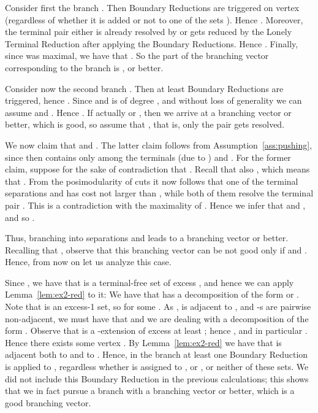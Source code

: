 Consider first the branch . Then  Boundary Reductions are triggered on vertex  (regardless of whether it is added or not to one of the sets ). Hence . Moreover, the terminal pair  either is already resolved by  or gets reduced by the Lonely Terminal Reduction after applying the Boundary Reductions. Hence . Finally, since  was maximal, we have that . So the part of the branching vector corresponding to the branch  is , or better.

Consider now the second branch . Then at least  Boundary Reductions are triggered, hence . Since  and  is of degree ,  and without loss of generality we can assume  and . Hence . If actually  or , then we arrive at a branching vector  or better, which is good, so assume that , that is, only the pair  gets resolved.

We now claim that  and . The latter claim follows from Assumption~\ref{ass:pushing}, since then  contains only  among the terminals (due to ) and . For the former claim, suppose for the sake of contradiction that . Recall that also , which means that . From the posimodularity of cuts it now follows that one of the terminal separations  and  has cost not larger than , while both of them resolve the terminal pair . This is a contradiction with the maximality of . Hence we infer that  and , and so .

Thus, branching into separations  and  leads to a branching vector  or better. Recalling that , observe that this branching vector can be not good only if  and . Hence, from now on let us analyze this case.

Since , we have that  is a terminal-free set of excess , and hence we can apply Lemma~\ref{lem:ex2-red} to it: We have that  has a decomposition of the form  or . Note that  is an excess-1 set, so  for some . As ,  is adjacent to , and -s are pairwise non-adjacent, we must have that  and we are dealing with a decomposition of the form . Observe that  is a -extension of excess at least ; hence , and in particular . Hence there exists some vertex . By Lemma~\ref{lem:ex2-red} we have that  is adjacent both to  and to . Hence, in the branch  at least one Boundary Reduction is applied to , regardless whether  is assigned to , or , or neither of these sets. We did not include this Boundary Reduction in the previous calculations; this shows that we in fact pursue a branch with a branching vector  or better, which is a good branching vector.









